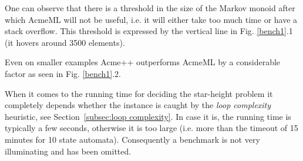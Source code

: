 One can observe that there is a threshold in the size of the Markov
monoid after which AcmeML will not be useful, i.e. it will either take
too much time or have a stack overflow. This threshold is expressed by
the vertical line in Fig. \ref{bench1}.1 (it hovers around 3500 elements).

Even on smaller examples Acme++ outperforms AcmeML by a considerable
factor as seen in Fig. \ref{bench1}.2.

When it comes to the running time for deciding the star-height problem it
completely depends whether the instance is caught by the {\em loop complexity}
heuristic, see Section~\ref{subsec:loop complexity}. In case it is, the running
time is typically a few seconds, otherwise it is too large (i.e. more than the
timeout of 15 minutes for 10 state automata). Consequently a benchmark is not
very illuminating and has been omitted.
%

